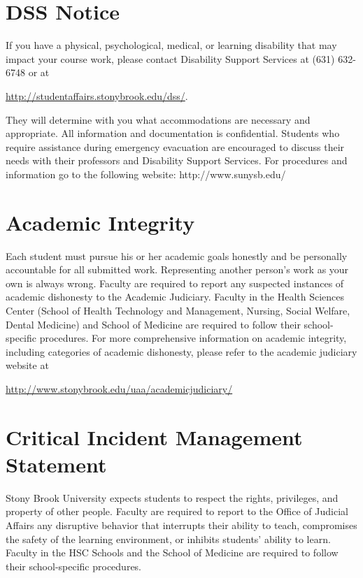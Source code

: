 \documentclass[11pt]{amsart}
\numberwithin{equation}{section}
\begin{document}
\section{DSS Notice}
If you have a physical, psychological, medical, or learning disability that may impact your course work, please contact Disability Support Services at (631) 632-6748 or at 
\begin{center}
\url{http://studentaffairs.stonybrook.edu/dss/}.
\end{center}
They will determine with you what accommodations are necessary and appropriate. All information and documentation is confidential. Students who require assistance during emergency evacuation are encouraged to discuss their needs with their professors and Disability Support Services. For procedures and information go to the following website: http://www.sunysb.edu/

\section{Academic Integrity}
Each student must pursue his or her academic goals honestly and be personally accountable for all submitted work. Representing another person's work as your own is always wrong. Faculty are required to report any suspected instances of academic dishonesty to the Academic Judiciary. Faculty in the Health Sciences Center (School of Health Technology and Management, Nursing, Social Welfare, Dental Medicine) and School of Medicine are required to follow their school-specific procedures. For more comprehensive information on academic integrity, including categories of academic dishonesty, please refer to the academic judiciary website at 
\begin{center}
\url{http://www.stonybrook.edu/uaa/academicjudiciary/}
\end{center}

\section{Critical Incident Management Statement}
Stony Brook University expects students to respect the rights, privileges, and property of other people. Faculty are required to report to the Office of Judicial Affairs any disruptive behavior that interrupts their ability to teach, compromises the safety of the learning environment, or inhibits students' ability to learn. Faculty in the HSC Schools and the School of Medicine are required to follow their school-specific procedures.
\end{document}
